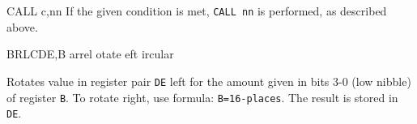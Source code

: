 \begin{basedescript}{
	\desclabelstyle{\multilinelabel}
	\desclabelwidth{3cm}}
\begin{DetailItem}{CALL c,nn}{}
		If the given condition is met, {\tt CALL nn} is performed, as described above.

		\begin{DetailEffects}
			\FlagsCALLccnn
		\end{DetailEffects}

		\begin{DetailTiming}
			\DetailTime[c\normalfont{=false}]{3}{10}
			\DetailTime[c\normalfont{=true}]{5}{17}
		\end{DetailTiming}

	\end{DetailItem}

	\pagebreak


	\begin{DetailItem}{BRLC}{DE,B\ZXN}
		{arrel otate eft ircular}
		{\SymBRLC}

		Rotates value in register pair {\tt DE} left for the amount given in bits 3-0 (low nibble) of register {\tt B}. To rotate right, use formula: {\tt B=16-places}. The result is stored in {\tt DE}.

		\begin{DetailEffects}
			\FlagsBRLC
		\end{DetailEffects}

		\begin{DetailTiming}
			\DetailTime{2}{8}
		\end{DetailTiming}

	\end{DetailItem}



\end{basedescript}
